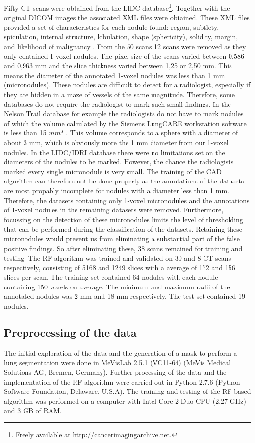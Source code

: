 Fifty CT scans were obtained from the LIDC database\footnote{Freely available at
\url{http://cancerimagingarchive.net}.}. Together with the original DICOM images
the associated XML files were obtained. These XML files provided a set of
characteristics for each nodule found: region, subtlety, spiculation, internal
structure, lobulation, shape (sphericity), solidity, margin, and likelihood of
malignancy \cite{lidcbase}. From the 50 scans 12 scans were removed as they only
contained 1-voxel nodules. The pixel size of the scans varied between 0,586 and
0,963 mm and the slice thickness varied between 1,25 or 2,50 mm. This means the
diameter of the annotated 1-voxel nodules was less than 1 mm (micronodules).
These nodules are difficult to detect for a radiologist, especially if they are
hidden in a maze of vessels of the same magnitude. Therefore, some databases do
not require the radiologist to mark such small findings. In the Nelson Trail
database for example the radiologists do not have to mark nodules of which the
volume calculated by the Siemens LungCARE workstation software is less than 15
$mm^3$ \cite{mur}. This volume corresponds to a sphere with a diameter of about
3 mm, which is obviously more the 1 mm diameter from our 1-voxel nodules.
In the LIDC/IDRI database there were no limitations set on the diameters of the
nodules to be marked. However, the chance the radiologists marked every single
micronodule is very small. The training of the CAD algorithm can therefore not
be done properly as the annotations of the datasets are most propably incomplete
for nodules with a diameter less than 1 mm. Therefore, the datasets containing
only 1-voxel micronodules and the annotations of 1-voxel nodules in the
remaining datasets were removed. Furthermore, focussing on the detection of
these micronodules limits the level of thresholding that can be performed during
the classification of the datasets. Retaining these micronodules would prevent
us from eliminating a substantial part of the false positive findings. So after
eliminating these, 38 scans remained for training and testing.
The RF algorithm was trained and validated on 30 and 8 CT scans respectively,
consisting of 5168 and 1249 slices with a average of 172 and 156 slices per
scan. The training set contained 64 nodules with each nodule containing 150
voxels on average. The minimum and maximum radii of the annotated nodules was 2
mm and 18 mm respectively. The test set contained 19 nodules.

\subsection{Preprocessing of the data}
The initial exploration of the data and the generation of a mask to perform a
lung segmentation were done in MeVisLab 2.5.1 (VC11-64) (MeVis Medical Solutions
AG, Bremen, Germany). Further processing of the data and the implementation of
the RF algorithm were carried out in Python 2.7.6 (Python Software Foundation,
Delaware, U.S.A). The training and testing of the RF based algorithm was
performed on a computer with Intel Core 2 Duo CPU (2,27 GHz) and 3 GB of RAM.

